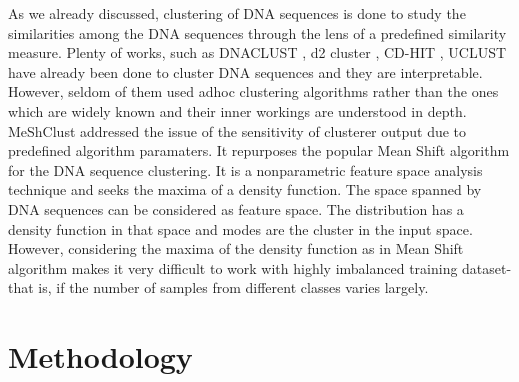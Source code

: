 \documentclass[oneside, twocolumn, a4paper, 10pt]{IEEEtran}
\begin{document}
\par
As we already discussed, clustering of DNA sequences is done to study the similarities among the DNA sequences through the lens of a predefined similarity measure. Plenty of works, such as DNACLUST \cite{11}, d2 cluster \cite{12}, CD-HIT \cite{13}, UCLUST \cite{14} have already been done to cluster DNA sequences and they are interpretable. However, seldom of them used adhoc clustering algorithms rather than the ones which are widely known and their inner workings are understood in depth. MeShClust \cite{15} addressed the issue of the sensitivity of clusterer output due to predefined algorithm paramaters. It repurposes the popular Mean Shift algorithm \cite{16} for the DNA sequence clustering. It is a nonparametric feature space analysis technique and seeks the maxima of a density function. The space spanned by DNA sequences can be considered as feature space. The distribution has a density function in that space and modes are the cluster in the input space. However, considering the maxima of the density function as in Mean Shift algorithm makes it very difficult to work with highly imbalanced training dataset- that is, if the number of samples from different classes varies largely.
\section{Methodology}
\end{document}
